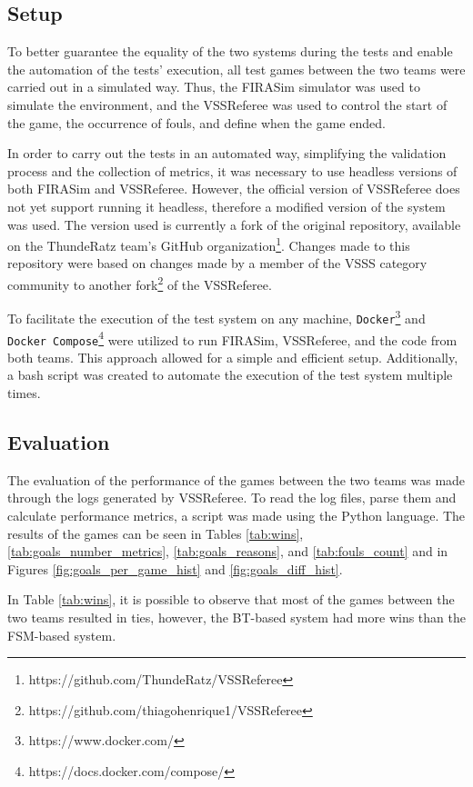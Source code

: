 \subsection{Setup}

To better guarantee the equality of the two systems during the tests and enable the automation of the tests' execution, all test games between the two teams were carried out in a simulated way. Thus, the FIRASim simulator was used to simulate the environment, and the VSSReferee was used to control the start of the game, the occurrence of fouls, and define when the game ended.

In order to carry out the tests in an automated way, simplifying the validation process and the collection of metrics, it was necessary to use headless versions of both FIRASim and VSSReferee. However, the official version of VSSReferee does not yet support running it headless, therefore a modified version of the system was used. The version used is currently a fork of the original repository, available on the ThundeRatz team's GitHub organization\footnote{https://github.com/ThundeRatz/VSSReferee}. Changes made to this repository were based on changes made by a member of the VSSS category community to another fork\footnote{https://github.com/thiagohenrique1/VSSReferee} of the VSSReferee.

To facilitate the execution of the test system on any machine, \texttt{Docker}\footnote{https://www.docker.com/} and \texttt{Docker Compose}\footnote{https://docs.docker.com/compose/} were utilized to run FIRASim, VSSReferee, and the code from both teams. This approach allowed for a simple and efficient setup. Additionally, a bash script was created to automate the execution of the test system multiple times.

\subsection{Evaluation}

The evaluation of the performance of the games between the two teams was made through the logs generated by VSSReferee. To read the log files, parse them and calculate performance metrics, a script was made using the Python language. The results of the games can be seen in Tables \ref{tab:wins}, \ref{tab:goals_number_metrics}, \ref{tab:goals_reasons}, and \ref{tab:fouls_count} and in Figures \ref{fig:goals_per_game_hist} and \ref{fig:goals_diff_hist}.

In Table \ref{tab:wins}, it is possible to observe that most of the games between the two teams resulted in ties, however, the BT-based system had more wins than the FSM-based system.

